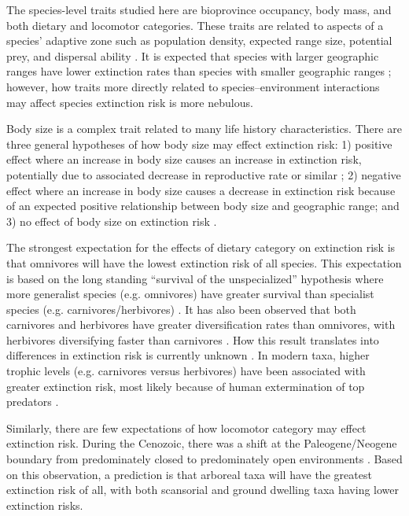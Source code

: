 \documentclass{pnastwo}
\begin{document}
\begin{article}
The species-level traits studied here are bioprovince occupancy, body mass, and both dietary and locomotor categories. These traits are related to aspects of a species' adaptive zone such as population density, expected range size, potential prey, and dispersal ability \cite{Smith2004,Jernvall2004}. It is expected that species with larger geographic ranges have lower extinction rates than species with smaller geographic ranges \cite{Jablonski1986,Roy2009c}; however, how traits more directly related to species--environment interactions may affect species extinction risk is more nebulous.

Body size is a complex trait related to many life history characteristics. There are three general hypotheses of how body size may effect extinction risk: 1) positive effect where an increase in body size causes an increase in extinction risk, potentially due to associated decrease in reproductive rate or similar \cite{Liow2008,Liow2009}; 2) negative effect where an increase in body size causes a decrease in extinction risk because of an expected positive relationship between body size and geographic range; and 3) no effect of body size on extinction risk \cite{Tomiya2013}. 

The strongest expectation for the effects of dietary category on extinction risk is that omnivores will have the lowest extinction risk of all species. This expectation is based on the long standing ``survival of the unspecialized'' hypothesis where more generalist species (e.g. omnivores) have greater survival than specialist species (e.g. carnivores/herbivores) \cite{Simpson1944,Liow2004a}. It has also been observed that both carnivores and herbivores have greater diversification rates than omnivores, with herbivores diversifying faster than carnivores \cite{Price2012}. How this result translates into differences in extinction risk is currently unknown \cite{Rabosky2010a}. In modern taxa, higher trophic levels (e.g. carnivores versus herbivores) have been associated with greater extinction risk, most likely because of human extermination of top predators \cite{Liow2009,Purvis2000a}. 

Similarly, there are few expectations of how locomotor category may effect extinction risk. During the Cenozoic, there was a shift at the Paleogene/Neogene boundary from predominately closed to predominately open environments \cite{Blois2009,Janis1993a}. Based on this observation, a prediction is that arboreal taxa will have the greatest extinction risk of all, with both scansorial and ground dwelling taxa having lower extinction risks. 


\end{article}
\end{document}
